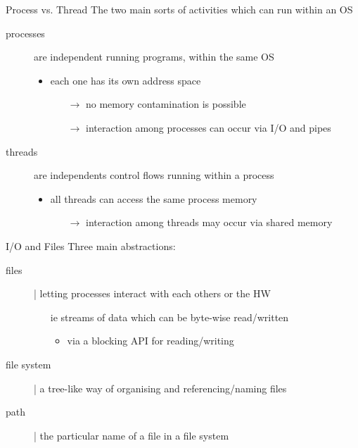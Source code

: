 \documentclass{beamer}\mode<presentation>{\usetheme{AMSBolognaFC}}
\begin{document}
\begin{frame}[allowframebreaks]
    \begin{block}{Process vs. Thread}
        The two main sorts of activities which can run within an OS
        \begin{description}
            \item[processes] are independent running programs, within the same OS
            \begin{itemize}
                \item each one has its own address space
                \begin{itemize}
                    \item[$\rightarrow$] no memory contamination is possible
                    \item[$\rightarrow$] interaction among processes can occur via I/O and pipes
                \end{itemize}
            \end{itemize}

            \item[threads] are independents control flows running within a process
            \begin{itemize}
                \item all threads can access the same process memory
                \begin{itemize}
                    \item[$\rightarrow$] interaction among threads may occur via shared memory
                \end{itemize}
            \end{itemize}
        \end{description}
    \end{block}

    \begin{block}{I/O and Files}
        Three main abstractions:
        \begin{description}
            \item[files] | letting processes interact with each others or the HW
            \begin{itemize}
                \item[ie] \alert{streams} of data which can be byte-wise \alert{read/written}
                \begin{itemize}
                    \item via a \alert{blocking} API for reading/writing
                \end{itemize}
            \end{itemize}

            \item[file system] | a \alert{tree}-like way of organising and \alert{referencing}/naming files

            \item[path] | the particular name of a file in a file system
        \end{description}
    \end{block}
\end{frame}
\end{document}
